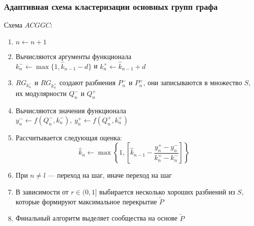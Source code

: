 \begin{frame}
	\frametitle{Адаптивная схема кластеризации основных групп графа}

	Схема $ACGGC$:
	\begin{enumerate}
		\item $n \leftarrow n + 1$
		\item Вычисляются аргументы функционала\\
		$k_n^{-} \leftarrow \max\{1, \hat{k}_{n - 1} - d\}$ и $k_n^{+} \leftarrow \hat{k}_{n - 1} + d$
		\item $RG_{k_n^{-}}$ и $RG_{k_n^{+}}$ создают разбиения $P_n^{-}$ и $P_n^{+}$, они записываются в множество $S$, их модулярности $Q_n^{-}$ и $Q_n^{+}$
		\item Вычисляются значения функционала\\
		$y_n^{-} \leftarrow f(Q_n^{-}, k_n^{-}),\ y_n^{+} \leftarrow f(Q_n^{+}, k_n^{+})$
		\item Рассчитывается следующая оценка:
		$$\hat{k}_n \leftarrow \max\left\{1, \left[\hat{k}_{n - 1} - \frac{y_n^{+} - y_n^{-}}{k_n^{+} - k_n^{-}}\right]\right\}$$
		\item При $n \ne l$ --- переход на  шаг, иначе переход на  шаг
		\item В зависимости от $r \in (0, 1]$ выбирается несколько хороших разбиений из $S$, которые формируют максимальное перекрытие $\widetilde{P}$
		\item Финальный алгоритм выделяет сообщества на основе $\widetilde{P}$
	\end{enumerate}
\end{frame}


